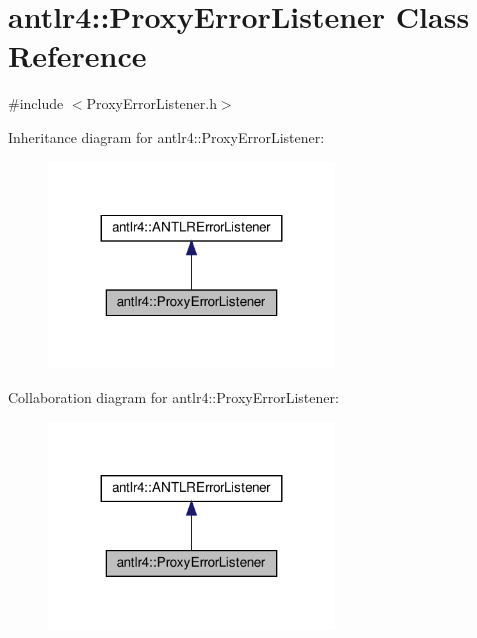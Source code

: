 \hypertarget{classantlr4_1_1ProxyErrorListener}{}\section{antlr4\+:\+:Proxy\+Error\+Listener Class Reference}
\label{classantlr4_1_1ProxyErrorListener}


{\ttfamily \#include $<$Proxy\+Error\+Listener.\+h$>$}



Inheritance diagram for antlr4\+:\+:Proxy\+Error\+Listener\+:
\nopagebreak
\begin{figure}[H]
\begin{center}
\leavevmode
\includegraphics[width=215pt]{classantlr4_1_1ProxyErrorListener__inherit__graph}
\end{center}
\end{figure}


Collaboration diagram for antlr4\+:\+:Proxy\+Error\+Listener\+:
\nopagebreak
\begin{figure}[H]
\begin{center}
\leavevmode
\includegraphics[width=215pt]{classantlr4_1_1ProxyErrorListener__coll__graph}
\end{center}
\end{figure}
